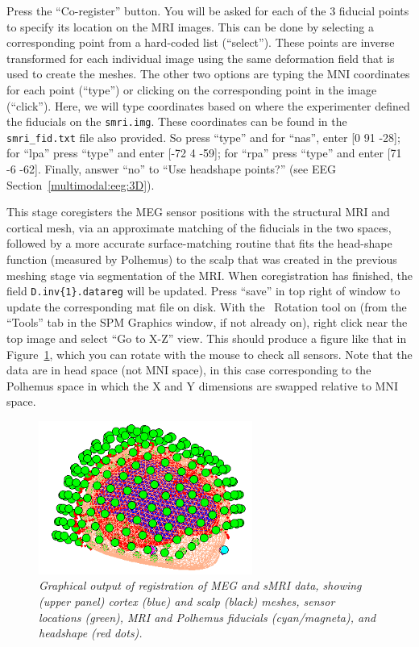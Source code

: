 Press the ``Co-register'' button. You will be asked for each of the 3 fiducial points to specify its location on the MRI images. This can be done by selecting a corresponding point from a hard-coded list (``select''). These points are inverse transformed for each individual image using the same deformation field that is used to create the meshes. The other two options are typing the MNI coordinates for each point (``type'') or clicking on the corresponding point in the image (``click''). Here, we will type coordinates based on where the experimenter defined the fiducials on the \texttt{smri.img}. These coordinates can be found in the \texttt{smri\_fid.txt} file also provided. So press ``type'' and for ``nas'', enter [0  91  -28]; for ``lpa'' press ``type'' and enter [-72   4  -59]; for ``rpa'' press ``type'' and enter [71  -6  -62]. Finally, answer ``no'' to ``Use headshape points?'' (see EEG Section~\ref{multimodal:eeg:3D}).

This stage coregisters the MEG sensor positions with the structural MRI and cortical mesh, via an approximate matching of the fiducials in the two spaces, followed by a more accurate surface-matching routine that fits the head-shape function (measured by Polhemus) to the scalp that was created in the previous meshing stage via segmentation of the MRI. When coregistration has finished, the field \texttt{D.inv\{1\}.datareg} will be updated. Press ``save'' in top right of window to update the corresponding mat file on disk. With the \matlab\ Rotation tool on (from the ``Tools'' tab in the SPM Graphics window, if not already on), right click near the top image and select ``Go to X-Z'' view. This should produce a figure like that in Figure~\ref{multimodal:fig:17}, which you can rotate with the mouse to check all sensors. Note that the data are in head space (not MNI space), in this case corresponding to the Polhemus space in which the X and Y dimensions are swapped relative to MNI space.

\begin{figure}
\begin{center}
\includegraphics[width=70mm]{multimodal/figures/meg_coreg.png}
\caption{\em  Graphical output of registration of MEG and sMRI data, showing (upper panel) cortex (blue) and scalp (black) meshes, sensor locations (green), MRI and Polhemus fiducials (cyan/magneta), and headshape (red dots).\label{multimodal:fig:17}}
\end{center}
\end{figure}

